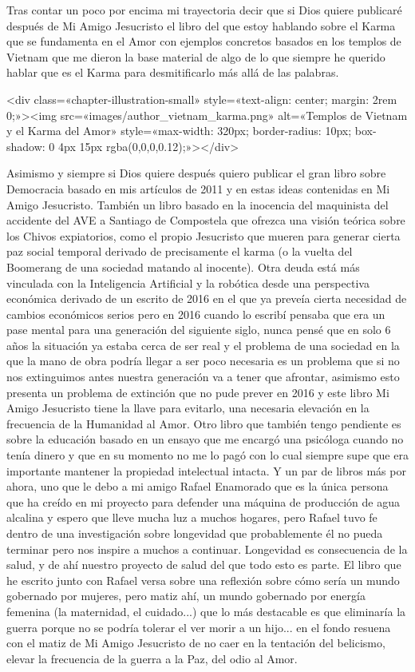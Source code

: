 \documentclass[12pt,twoside,openany]{book}
\begin{document}
Tras contar un poco por encima mi trayectoria decir que si Dios quiere publicaré después de Mi Amigo Jesucristo el libro del que estoy hablando sobre el Karma que se fundamenta en el Amor con ejemplos concretos basados en los templos de Vietnam que me dieron la base material de algo de lo que siempre he querido hablar que es el Karma para desmitificarlo más allá de las palabras.

<div class=«chapter-illustration-small» style=«text-align: center; margin: 2rem 0;»><img src=«images/author_vietnam_karma.png» alt=«Templos de Vietnam y el Karma del Amor» style=«max-width: 320px; border-radius: 10px; box-shadow: 0 4px 15px rgba(0,0,0,0.12);»></div>

Asimismo y siempre si Dios quiere después quiero publicar el gran libro sobre Democracia basado en mis artículos de 2011 y en estas ideas contenidas en Mi Amigo Jesucristo. También un libro basado en la inocencia del maquinista del accidente del AVE a Santiago de Compostela que ofrezca una visión teórica sobre los Chivos expiatorios, como el propio Jesucristo que mueren para generar cierta paz social temporal derivado de precisamente el karma (o la vuelta del Boomerang de una sociedad matando al inocente). Otra deuda está más vinculada con la Inteligencia Artificial y la robótica desde una perspectiva económica derivado de un escrito de 2016 en el que ya preveía cierta necesidad de cambios económicos serios pero en 2016 cuando lo escribí pensaba que era un pase mental para una generación del siguiente siglo, nunca pensé que en solo 6 años la situación ya estaba cerca de ser real y el problema de una sociedad en la que la mano de obra podría llegar a ser poco necesaria es un problema que si no nos extinguimos antes nuestra generación va a tener que afrontar, asimismo esto presenta un problema de extinción que no pude prever en 2016 y este libro Mi Amigo Jesucristo tiene la llave para evitarlo, una necesaria elevación en la frecuencia de la Humanidad al Amor. Otro libro que también tengo pendiente es sobre la educación basado en un ensayo que me encargó una psicóloga cuando no tenía dinero y que en su momento no me lo pagó con lo cual siempre supe que era importante mantener la propiedad intelectual intacta. Y un par de libros más por ahora, uno que le debo a mi amigo Rafael Enamorado que es la única persona que ha creído en mi proyecto para defender una máquina de producción de agua alcalina y espero que lleve mucha luz a muchos hogares, pero Rafael tuvo fe dentro de una investigación sobre longevidad que probablemente él no pueda terminar pero nos inspire a muchos a continuar. Longevidad es consecuencia de la salud, y de ahí nuestro proyecto de salud del que todo esto es parte. El libro que he escrito junto con Rafael versa sobre una reflexión sobre cómo sería un mundo gobernado por mujeres, pero matiz ahí, un mundo gobernado por energía femenina (la maternidad, el cuidado...) que lo más destacable es que eliminaría la guerra porque no se podría tolerar el ver morir a un hijo... en el fondo resuena con el matiz de Mi Amigo Jesucristo de no caer en la tentación del belicismo, elevar la frecuencia de la guerra a la Paz, del odio al Amor. 
\end{document}
